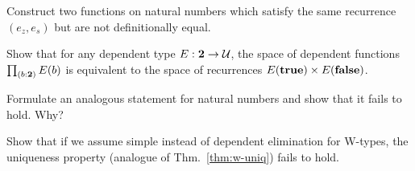 \begin{ex}
  Construct two functions on natural numbers which satisfy the same recurrence $(e_z, e_s)$ but are not definitionally equal.
\end{ex}

\begin{ex}
Show that for any dependent type $E : {\mathbf{2}} \to \mathcal{U}$, the space of dependent functions $\prd{b : \two} E(b)$ is equivalent to the space of recurrences $ E(\mathbf{true}) \times E(\mathbf{false})$. 
\end{ex}

\begin{ex}
  Formulate an analogous statement for natural numbers and show that it fails to hold. Why?
\end{ex}

\begin{ex}
  Show that if we assume simple instead of dependent elimination for W-types, the uniqueness property (analogue of Thm.~\ref{thm:w-uniq}) fails to hold.
\end{ex}


